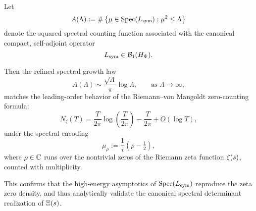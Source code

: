 \begin{corollary}
\label{cor:zeta_compatibility}

Let
\[
A(\Lambda) := \#\left\{ \mu \in \operatorname{Spec}(L_{\mathrm{sym}}) : \mu^2 \le \Lambda \right\}
\]
denote the squared spectral counting function associated with the canonical compact, self-adjoint operator
\[
L_{\mathrm{sym}} \in \mathcal{B}_1(H_{\Psi}).
\]

Then the refined spectral growth law
\[
A(\Lambda) \sim \frac{\sqrt{\Lambda}}{\pi} \log \Lambda, \qquad \text{as } \Lambda \to \infty,
\]
matches the leading-order behavior of the Riemann–von Mangoldt zero-counting formula:
\[
N_\zeta(T) = \frac{T}{2\pi} \log\left( \frac{T}{2\pi} \right) - \frac{T}{2\pi} + O(\log T),
\]
under the spectral encoding
\[
\mu_\rho := \frac{1}{i} \left( \rho - \tfrac{1}{2} \right),
\]
where \( \rho \in \mathbb{C} \) runs over the nontrivial zeros of the Riemann zeta function \( \zeta(s) \), counted with multiplicity.

\medskip

\noindent
This confirms that the high-energy asymptotics of \( \operatorname{Spec}(L_{\mathrm{sym}}) \) reproduce the zeta zero density, and thus analytically validate the canonical spectral determinant realization of \( \Xi(s) \).
\end{corollary}
